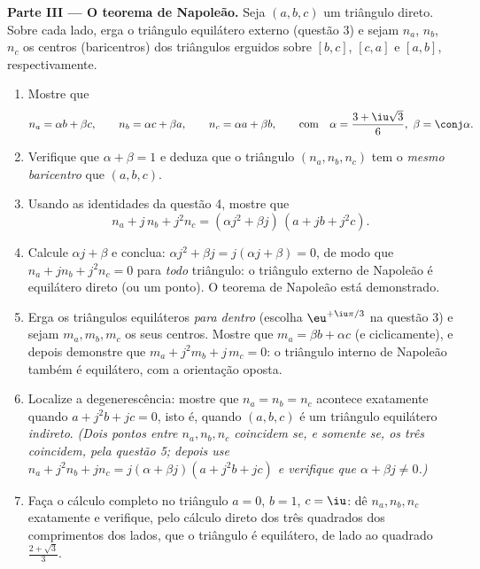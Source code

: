 \begin{problem}
\medskip
\noindent\textbf{Parte III --- O teorema de Napoleão.} Seja $(a, b, c)$
um triângulo direto. Sobre cada lado, erga o triângulo equilátero
externo (questão 3) e sejam $n_a$, $n_b$, $n_c$ os centros
(baricentros) dos triângulos erguidos sobre $[b, c]$, $[c, a]$ e
$[a, b]$, respectivamente.
\begin{enumerate}
  \item Mostre que
        \[
        n_a = \alpha b + \beta c, \qquad
        n_b = \alpha c + \beta a, \qquad
        n_c = \alpha a + \beta b,
        \qquad\text{com}\quad
        \alpha = \frac{3 + \iu\sqrt3}{6},\ \beta = \conj\alpha .
        \]
  \item Verifique que $\alpha + \beta = 1$ e deduza que o triângulo
        $(n_a, n_b, n_c)$ tem o \emph{mesmo baricentro} que
        $(a, b, c)$.
  \item Usando as identidades da questão 4, mostre que
        \[
        n_a + j\,n_b + j^2 n_c
        = (\alpha j^2 + \beta j)\,(a + jb + j^2c) .
        \]
  \item Calcule $\alpha j + \beta$ e conclua: $\alpha j^2 +
        \beta j = j(\alpha j + \beta) = 0$, de modo que $n_a + j n_b + j^2
        n_c = 0$ para \emph{todo} triângulo: o triângulo
        externo de Napoleão é equilátero direto (ou um ponto). O
        teorema de Napoleão está demonstrado.
  \item Erga os triângulos equiláteros \emph{para dentro}
        (escolha $\eu^{+\iu\pi/3}$ na questão 3) e sejam $m_a, m_b,
        m_c$ os seus centros. Mostre que $m_a = \beta b + \alpha c$ (e
        ciclicamente), e depois demonstre que $m_a + j^2 m_b + j\,m_c = 0$: o
        triângulo interno de Napoleão também é equilátero, com a
        orientação oposta.
  \item Localize a degenerescência: mostre que $n_a = n_b = n_c$ acontece
        exatamente quando $a + j^2 b + jc = 0$, isto é, quando $(a, b, c)$
        é um triângulo equilátero \emph{indireto}. \emph{(Dois
        pontos entre $n_a, n_b, n_c$ coincidem se, e somente se, os três
        coincidem, pela questão 5; depois use $n_a + j^2 n_b + j n_c = j(\alpha +
        \beta j)(a + j^2b + jc)$ e verifique que $\alpha + \beta j \neq
        0$.)}
  \item Faça o cálculo completo no triângulo $a = 0$,
        $b = 1$, $c = \iu$: dê $n_a, n_b, n_c$ exatamente e
        verifique, pelo cálculo direto dos três quadrados dos
        comprimentos dos lados, que o triângulo é equilátero, de lado
        ao quadrado $\frac{2 + \sqrt3}{3}$.
\end{enumerate}


\end{problem}
